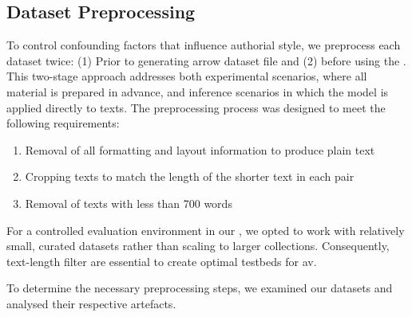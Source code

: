 

\subsection{Dataset Preprocessing}
\label{subsec:dataset_preprocessing}

To control confounding factors that influence authorial style, we preprocess each dataset twice:
(1) Prior to generating arrow dataset file and (2) before using the \impAppr{}.
This two-stage approach addresses both experimental scenarios, where all material is prepared in advance, and inference scenarios in which the \impAppr{} model is applied directly to texts.
The preprocessing process was designed to meet the following requirements:
\begin{enumerate}
    \item Removal of all formatting and layout information to produce plain text
    \item Cropping texts to match the length of the shorter text in each pair
    \item Removal of texts with less than 700 words
\end{enumerate}
For a controlled evaluation environment in our \impAppr{}, we opted to work with relatively small, curated datasets rather than scaling to larger collections.  
Consequently, text-length filter are essential to create optimal testbeds for \ac{av}.

To determine the necessary preprocessing steps, we examined our datasets and analysed their respective artefacts.

